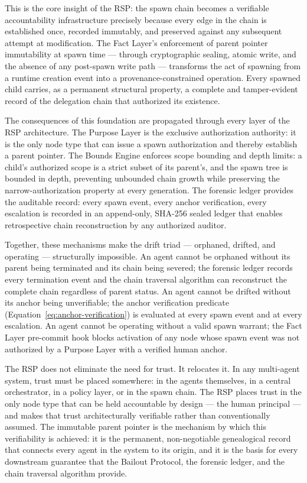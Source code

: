 This is the core insight of the RSP: the spawn chain becomes a verifiable accountability infrastructure precisely because every edge in the chain is established once, recorded immutably, and preserved against any subsequent attempt at modification. The Fact Layer's enforcement of parent pointer immutability at spawn time — through cryptographic sealing, atomic write, and the absence of any post-spawn write path — transforms the act of spawning from a runtime creation event into a provenance-constrained operation. Every spawned child carries, as a permanent structural property, a complete and tamper-evident record of the delegation chain that authorized its existence.

The consequences of this foundation are propagated through every layer of the RSP architecture. The Purpose Layer is the exclusive authorization authority: it is the only node type that can issue a spawn authorization and thereby establish a parent pointer. The Bounds Engine enforces scope bounding and depth limits: a child's authorized scope is a strict subset of its parent's, and the spawn tree is bounded in depth, preventing unbounded chain growth while preserving the narrow-authorization property at every generation. The forensic ledger provides the auditable record: every spawn event, every anchor verification, every escalation is recorded in an append-only, SHA-256 sealed ledger that enables retrospective chain reconstruction by any authorized auditor.

Together, these mechanisms make the drift triad — orphaned, drifted, and operating — structurally impossible. An agent cannot be orphaned without its parent being terminated and its chain being severed; the forensic ledger records every termination event and the chain traversal algorithm can reconstruct the complete chain regardless of parent status. An agent cannot be drifted without its anchor being unverifiable; the anchor verification predicate (Equation~\ref{eq:anchor-verification}) is evaluated at every spawn event and at every escalation. An agent cannot be operating without a valid spawn warrant; the Fact Layer pre-commit hook blocks activation of any node whose spawn event was not authorized by a Purpose Layer with a verified human anchor.

The RSP does not eliminate the need for trust. It relocates it. In any multi-agent system, trust must be placed somewhere: in the agents themselves, in a central orchestrator, in a policy layer, or in the spawn chain. The RSP places trust in the only node type that can be held accountable by design — the human principal — and makes that trust architecturally verifiable rather than conventionally assumed. The immutable parent pointer is the mechanism by which this verifiability is achieved: it is the permanent, non-negotiable genealogical record that connects every agent in the system to its origin, and it is the basis for every downstream guarantee that the Bailout Protocol, the forensic ledger, and the chain traversal algorithm provide.

